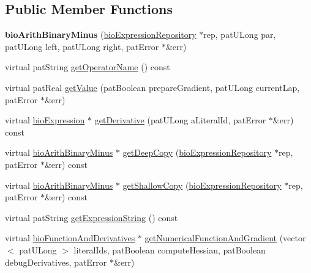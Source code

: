 \subsection*{Public Member Functions}
\begin{DoxyCompactItemize}
\item 
\mbox{\label{classbio_arith_binary_minus_ae67eeb46184512f95d09c2d06613db40}} 
{\bfseries bio\+Arith\+Binary\+Minus} (\hyperlink{classbio_expression_repository}{bio\+Expression\+Repository} $\ast$rep, pat\+U\+Long par, pat\+U\+Long left, pat\+U\+Long right, pat\+Error $\ast$\&err)
\item 
virtual pat\+String \hyperlink{classbio_arith_binary_minus_a899f710bd1ba441724b9e6d7b904aa88}{get\+Operator\+Name} () const
\item 
virtual pat\+Real \hyperlink{classbio_arith_binary_minus_a0a30a984e72adb63304f75c0c53552f9}{get\+Value} (pat\+Boolean prepare\+Gradient, pat\+U\+Long current\+Lap, pat\+Error $\ast$\&err)
\item 
virtual \hyperlink{classbio_expression}{bio\+Expression} $\ast$ \hyperlink{classbio_arith_binary_minus_a7ccf12cccc95f788423753e7f61fa64f}{get\+Derivative} (pat\+U\+Long a\+Literal\+Id, pat\+Error $\ast$\&err) const
\item 
virtual \hyperlink{classbio_arith_binary_minus}{bio\+Arith\+Binary\+Minus} $\ast$ \hyperlink{classbio_arith_binary_minus_af749ca839d3194cb7bdbf5407d2bb94b}{get\+Deep\+Copy} (\hyperlink{classbio_expression_repository}{bio\+Expression\+Repository} $\ast$rep, pat\+Error $\ast$\&err) const
\item 
virtual \hyperlink{classbio_arith_binary_minus}{bio\+Arith\+Binary\+Minus} $\ast$ \hyperlink{classbio_arith_binary_minus_a93db7cf10d0bdabd9c2b89544d767e6c}{get\+Shallow\+Copy} (\hyperlink{classbio_expression_repository}{bio\+Expression\+Repository} $\ast$rep, pat\+Error $\ast$\&err) const
\item 
virtual pat\+String \hyperlink{classbio_arith_binary_minus_abfcff7ef3048216027a44af8af40471e}{get\+Expression\+String} () const
\item 
virtual \hyperlink{classbio_function_and_derivatives}{bio\+Function\+And\+Derivatives} $\ast$ \hyperlink{classbio_arith_binary_minus_a647d9b7b5fd8d5154eeba376a11d2a27}{get\+Numerical\+Function\+And\+Gradient} (vector$<$ pat\+U\+Long $>$ literal\+Ids, pat\+Boolean compute\+Hessian, pat\+Boolean debug\+Derivatives, pat\+Error $\ast$\&err)
\end{DoxyCompactItemize}
